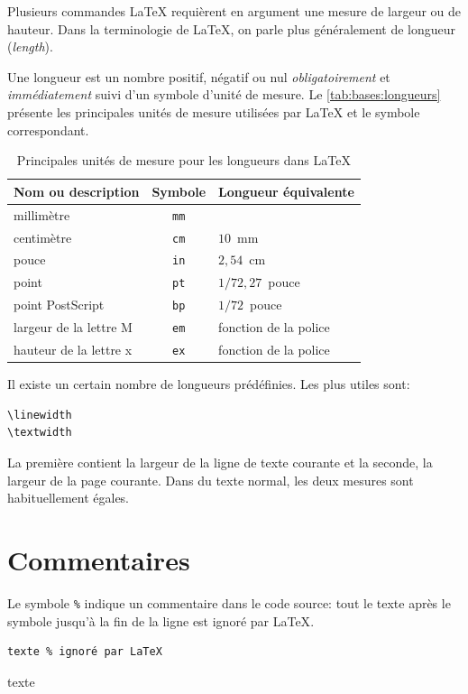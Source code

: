 Plusieurs commandes {\LaTeX} requièrent en argument une mesure de
largeur ou de hauteur. Dans la terminologie de {\LaTeX}, on parle plus
généralement de longueur (\emph{length}).

Une longueur est un nombre positif, négatif ou nul
\emph{obligatoirement} et \emph{immédiatement} suivi d'un symbole
d'unité de mesure. Le \autoref{tab:bases:longueurs} présente les
principales unités de mesure utilisées par {\LaTeX} et le symbole
correspondant.

\begin{table}
  \caption{Principales unités de mesure pour les longueurs dans
    {\LaTeX}}
  \label{tab:bases:longueurs}
  \centering
  \begin{tabular}{lcl}
    \toprule
    Nom ou description & Symbole & Longueur équivalente \\
    \midrule
    millimètre & \texttt{mm} \\
    centimètre & \texttt{cm} & $10$~mm \\
    pouce      & \texttt{in} & $2,54$~cm \\
    point      & \texttt{pt} & $1/72,27$~pouce \\
    point PostScript     & \texttt{bp}   & $1/72$~pouce \\
    largeur de la lettre M & \texttt{em} & fonction de la police \\
    hauteur de la lettre x & \texttt{ex} & fonction de la police \\
    \bottomrule
  \end{tabular}
\end{table}

Il existe un certain nombre de longueurs prédéfinies. Les plus utiles
sont:
\begin{lstlisting}
\linewidth
\textwidth
\end{lstlisting}
La première contient la largeur de la ligne de texte courante et la
seconde, la largeur de la page courante. Dans du texte normal, les
deux mesures sont habituellement égales.


\section{Commentaires}
\label{sec:bases:commentaires}

Le symbole \verb=%= indique un commentaire dans le code source: tout
le texte après le symbole jusqu'à la fin de la ligne est ignoré par
{\LaTeX}.
\begin{demo}
  \begin{texample}
\begin{lstlisting}
texte % ignoré par LaTeX
\end{lstlisting}
    \producing
    texte %
  \end{texample}
\end{demo}


